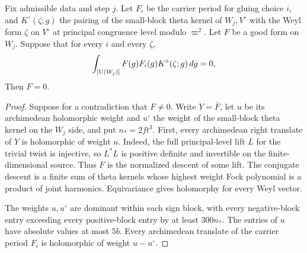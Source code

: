 \begin{lemma}
\label{lem:c-kernel-separation}
\emitthmsource
Fix admissible data and step $j$. Let $F_i$ be the carrier period for gluing choice $i$, and $K^\circ(\zeta;g)$ the pairing of the small-block theta kernel of $W_j,V^\circ$ with the Weyl form $\zeta$ on $V^\circ$ at principal congruence level modulo $\varpi^2$. Let $F$ be a good form on $W_j$. Suppose that for every $i$ and every $\zeta$,
\[
 \int_{[\operatorname{U}(W_j)]}F(g)F_i(g)K^\circ(\zeta;g)\,dg=0,
\]
Then $F=0$.
\end{lemma}

\begin{proof}
Suppose for a contradiction that $F\ne0$. Write $Y=\bar F$, let $u$ be its archimedean holomorphic weight and $u^\circ$ the weight of the small-block theta kernel on the $W_j$ side, and put $n_*=2ft^3$. First, every archimedean right translate of $Y$ is holomorphic of weight $u$. Indeed, the full principal-level lift $L$ for the trivial twist is injective, so $L^*L$ is positive definite and invertible on the finite-dimensional source. Thus $F$ is the normalized descent of some lift. The conjugate descent is a finite sum of theta kernels whose highest weight Fock polynomial is a product of joint harmonics. Equivariance gives holomorphy for every Weyl vector.

The weights $u,u^\circ$ are dominant within each sign block, with every negative-block entry exceeding every positive-block entry by at least $300n_*$. The entries of $u$ have absolute values at most $5b$. Every archimedean translate of the carrier period $F_i$ is holomorphic of weight $u-u^\circ$.


\end{proof}
